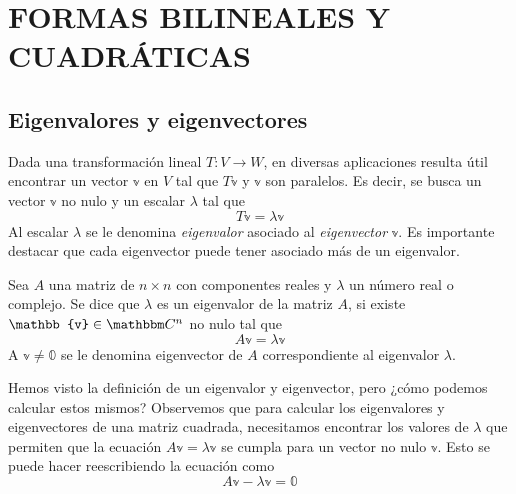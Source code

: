 \chapter{FORMAS BILINEALES Y CUADRÁTICAS}\label{chapter:bilineal}
\printchaptertableofcontents

\section{Eigenvalores y eigenvectores}

Dada una transformación lineal $T: V \longrightarrow W$, en diversas aplicaciones  resulta útil encontrar un vector $\mathbb{v}$ en $V$ tal que $T\mathbb{v}$ y $\mathbb{v}$ son paralelos. Es decir, se busca un vector $\mathbb{v}$ no nulo y un escalar $\lambda$ tal que
$$T\mathbb{v} = \lambda \mathbb{v}$$
Al escalar $\lambda$ se le denomina \emph{eigenvalor} asociado al \emph{eigenvector} $\mathbb{v}$. Es importante destacar que cada eigenvector puede tener asociado más de un eigenvalor.

\begin{definition}\label{def:eigenvalor}
    Sea $A$ una matriz de $n \times n$ con componentes reales y $\lambda$ un número real o complejo. Se dice que $\lambda$ es un eigenvalor de la matriz $A$, si existe $\mathbb{v} \in \CC[n]$ no nulo tal que
    $$A\mathbb{v} = \lambda \mathbb{v}$$
    A $\mathbb{v} \neq \mathbb{0}$ se le denomina eigenvector de $A$ correspondiente al eigenvalor $\lambda$.
\end{definition}

Hemos visto la definición de un eigenvalor y eigenvector, pero ¿cómo podemos calcular estos mismos? Observemos que para calcular los eigenvalores y eigenvectores de una matriz cuadrada, necesitamos encontrar los valores de $\lambda$ que permiten que la ecuación $A \mathbb{v} = \lambda \mathbb{v}$ se cumpla para un vector no nulo $\mathbb{v}$. Esto se puede hacer reescribiendo la ecuación como
$$A \mathbb{v} - \lambda \mathbb{v} = \mathbb{0}$$


